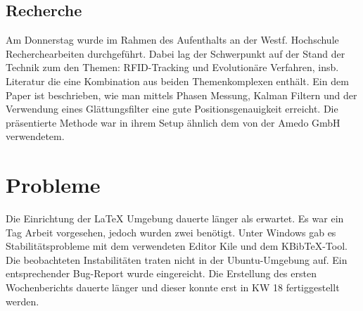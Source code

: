 \documentclass[a4paper,12pt,fleqn]{scrartcl}
\begin{document}
\subsection{Recherche}
Am Donnerstag wurde im Rahmen des Aufenthalts an der Westf. Hochschule Recherchearbeiten durchgeführt. Dabei lag der
Schwerpunkt auf der Stand der Technik zum den Themen: RFID-Tracking und Evolutionäre Verfahren, insb. Literatur die eine Kombination aus beiden
Themenkomplexen enthält. Ein dem Paper \cite{KALMANandSMOOTHING} ist beschrieben, wie man mittels Phasen Messung, Kalman Filtern \cite{Wiki:1} und der
Verwendung eines Glättungsfilter eine gute Positionsgenauigkeit erreicht. Die präsentierte Methode war in ihrem Setup ähnlich dem von der Amedo GmbH verwendetem.

\section[Probleme]{Probleme}
Die Einrichtung der \LaTeX{} Umgebung dauerte länger als erwartet. Es war ein
Tag Arbeit vorgesehen, jedoch wurden zwei benötigt.
Unter Windows gab es Stabilitätsprobleme mit dem verwendeten Editor Kile und dem KBibTeX-Tool.
Die beobachteten Instabilitäten traten nicht in der Ubuntu-Umgebung auf. Ein entsprechender Bug-Report wurde eingereicht.
Die Erstellung des ersten Wochenberichts dauerte länger und dieser konnte erst in KW 18 fertiggestellt werden.



\newpage


\end{document}

